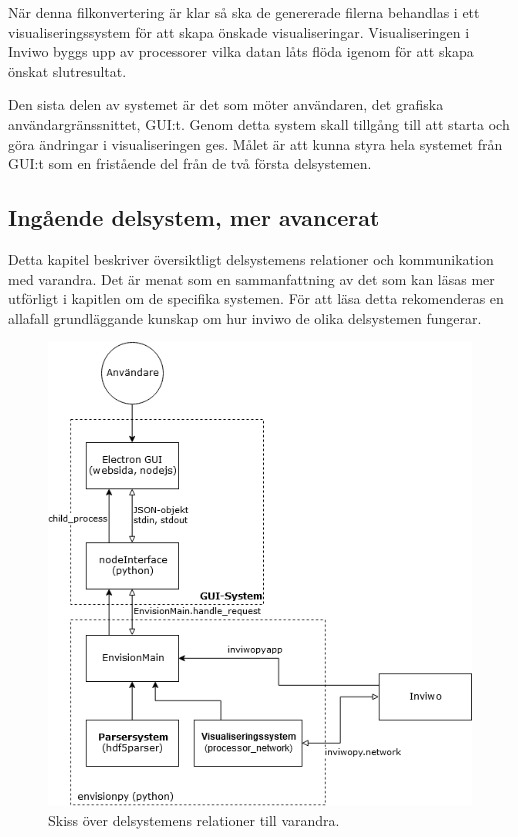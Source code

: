 \documentclass[10pt,oneside,swedish]{article}
\begin{document}
När denna filkonvertering är klar så ska de genererade filerna behandlas
i ett visualiseringssystem för att skapa önskade visualiseringar.
Visualiseringen i Inviwo byggs upp av processorer vilka datan låts flöda
igenom för att skapa önskat slutresultat.

Den sista delen av systemet är det som möter användaren, det grafiska
användargränssnittet, GUI:t. Genom detta system skall tillgång till att
starta och göra ändringar i visualiseringen ges. Målet är att kunna
styra hela systemet från GUI:t som en fristående del från de två första
delsystemen.

\subsection{Ingående delsystem, mer
avancerat}\label{inguxe5ende-delsystem-mer-avancerat}

Detta kapitel beskriver översiktligt delsystemens relationer och
kommunikation med varandra. Det är menat som en sammanfattning av det
som kan läsas mer utförligt i kapitlen om de specifika systemen. För att
läsa detta rekomenderas en allafall grundläggande kunskap om hur inviwo
de olika delsystemen fungerar.

\begin{figure}[H]\label{}
\centering
\includegraphics[width=1.00000\textwidth]{Images/Envision_system_advanced.png}
\caption{Skiss över delsystemens relationer till varandra.}
\end{figure}
\end{document}
